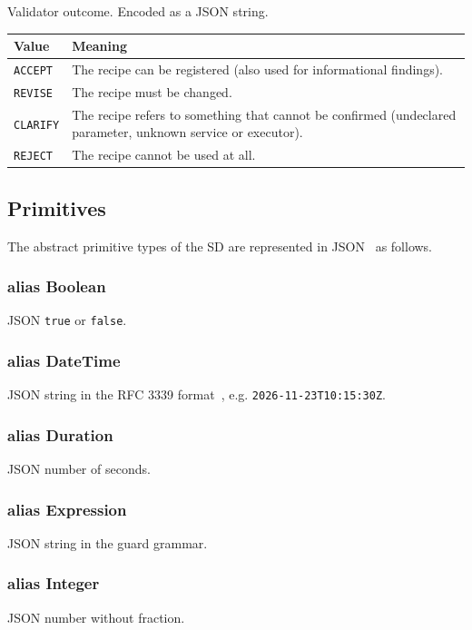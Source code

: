 \documentclass[a4paper]{arrowhead}
\newcommand{\pdef}[1]{{\textcolor{ArrowheadGrey}{#1\label{sec:model:primitives:#1}\label{sec:model:primitives:#1s}}}}
\begin{document}
Validator outcome.
 Encoded as a JSON string.
{\small
\begin{longtable}{|p{3.9cm}|p{11.9cm}|}

\hline
\rowcolor{gray!33} Value & Meaning \\ \hline
\endhead
\texttt{ACCEPT} & The recipe can be registered (also used for informational findings). \\ \hline
\texttt{REVISE} & The recipe must be changed. \\ \hline
\texttt{CLARIFY} & The recipe refers to something that cannot be confirmed (undeclared parameter, unknown service or executor). \\ \hline
\texttt{REJECT} & The recipe cannot be used at all. \\ \hline
\end{longtable}
}


\subsection{Primitives}
\label{sec:model:primitives}
The abstract primitive types of the SD are represented in JSON~\cite{rfc8259} as follows.
\subsubsection*{alias \pdef{Boolean}}
JSON \texttt{true} or \texttt{false}.

\subsubsection*{alias \pdef{DateTime}}
JSON string in the RFC 3339 format~\cite{rfc3339}, e.g. \texttt{2026-\allowbreak{}11-\allowbreak{}23T10:15:30Z}.

\subsubsection*{alias \pdef{Duration}}
JSON number of seconds.

\subsubsection*{alias \pdef{Expression}}
JSON string in the guard grammar.

\subsubsection*{alias \pdef{Integer}}
JSON number without fraction.
\end{document}
